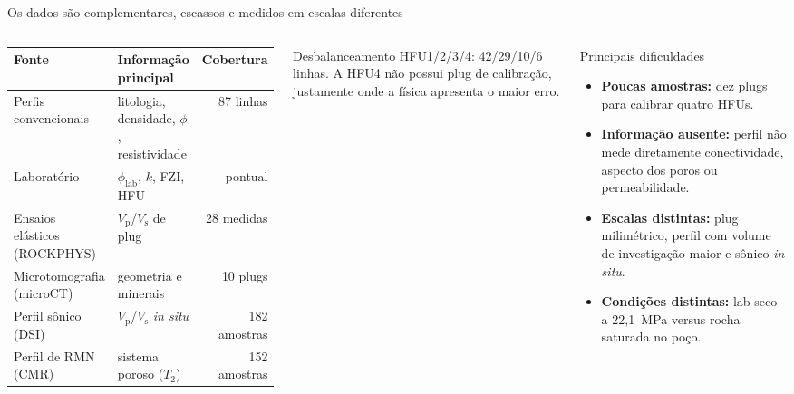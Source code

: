 \documentclass[aspectratio=169,10pt]{beamer}
\newcommand{\philab}{\ensuremath{\phi_{\mathrm{lab}}}}
\newcommand{\Vp}{\ensuremath{V_{\mathrm{p}}}}
\newcommand{\Vs}{\ensuremath{V_{\mathrm{s}}}}
\begin{document}
\begin{frame}[shrink=20]{Os dados s\~ao complementares, escassos e medidos em escalas diferentes}
  \scriptsize
  \begin{columns}[T,onlytextwidth]
    \centering
    \setlength{\tabcolsep}{2.5pt}
    \renewcommand{\arraystretch}{0.95}
    \begin{tabular}{%
      >{\raggedright\arraybackslash}p{2.35cm}%
      >{\raggedright\arraybackslash}p{1.95cm}r}
      \toprule
      Fonte & Informa\c{c}\~ao principal & Cobertura \\
      \midrule
      Perfis convencionais & litologia, densidade, $\phi$, resistividade
        & 87 linhas \\
      Laborat\'orio & \philab{}, $k$, FZI, HFU
        & pontual \\
      Ensaios el\'asticos (ROCKPHYS) & \Vp{}/\Vs{} de plug
        & 28 medidas \\
      Microtomografia (microCT) & geometria e minerais
        & 10 plugs \\
      Perfil s\^onico (DSI) & \Vp{}/\Vs{} \emph{in situ}
        & 182 amostras \\
      Perfil de RMN (CMR) & sistema poroso ($T_2$)
        & 152 amostras \\
      \bottomrule
    \end{tabular}
    \vspace{0.06cm}
    \begin{block}{Desbalanceamento}
      \scriptsize
      HFU1/2/3/4: 42/29/10/6 linhas.
      A HFU4 n\~ao possui plug de calibra\c{c}\~ao, justamente onde a
      f\'isica apresenta o maior erro.
    \end{block}
    \begin{exampleblock}{Principais dificuldades}
      \scriptsize
      \begin{itemize}
        \item \textbf{Poucas amostras:} dez plugs para calibrar quatro HFUs.
        \item \textbf{Informa\c{c}\~ao ausente:} perfil n\~ao mede diretamente
              conectividade, aspecto dos poros ou permeabilidade.
        \item \textbf{Escalas distintas:} plug milim\'etrico, perfil com
              volume de investiga\c{c}\~ao maior e s\^onico \emph{in situ}.
        \item \textbf{Condi\c{c}\~oes distintas:} lab seco a 22,1~MPa versus
              rocha saturada no po\c{c}o.

\end{itemize}
\end{exampleblock}
\end{columns}
\end{frame}
\end{document}
